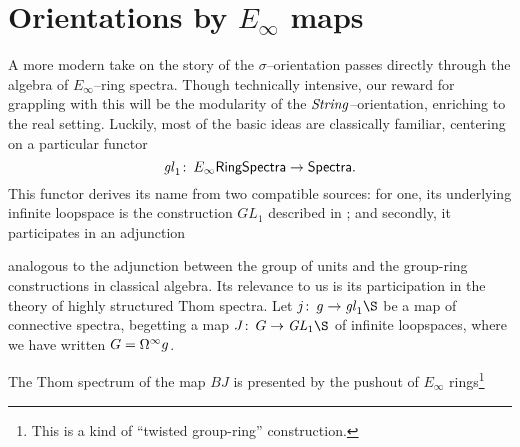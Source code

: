 \section{Orientations by \texorpdfstring{$E_\infty$}{Eoo} maps}\label{JuvitopTalkSection}

A more modern take on the story of the $\sigma$--orientation passes directly through the algebra of $E_\infty$--ring spectra.  Though technically intensive, our reward for grappling with this will be the modularity of the $\mathit{String}$--orientation, enriching  to the real setting.  Luckily, most of the basic ideas are classically familiar, centering on a particular functor \[\mathit{gl}_1\colon\thinspace E_\infty\mathsf{RingSpectra} \to \mathsf{Spectra}.\]  This functor derives its name from two compatible sources: for one, its underlying infinite loopspace is the construction $GL_1$ described in ; and secondly, it participates in an adjunction
\begin{center}
\end{center}
analogous to the adjunction between the group of units and the group-ring constructions in classical algebra.  Its relevance to us is its participation in the theory of highly structured Thom spectra.  Let $j\co g \to \gl_1 \S$ be a map of connective spectra, begetting a map $J\co G \to \GL_1 \S$ of infinite loopspaces, where we have written $G = \Omega^\infty g$.
\begin{lemma}
The Thom spectrum of the map $BJ$ is presented by the pushout of $E_\infty$ rings\footnote{This is a kind of ``twisted group-ring'' construction.}
\begin{center}
\end{center}
\end{lemma}

